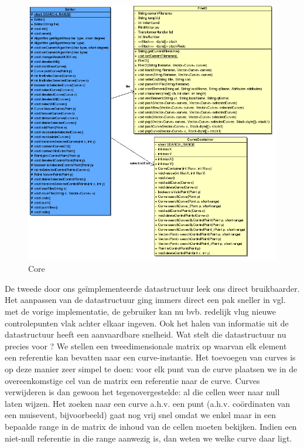 \documentclass[a4paper,11pt,oneside, titlepage]{article}
\begin{document}
\begin{figure}[htbp]
\centering
\includegraphics[scale=0.42]{./UML2/Core.png}
\caption{Core}\label{iCore}
\end{figure}
De tweede door ons ge\"implementeerde datastructuur leek ons direct bruikbaarder. Het aanpassen van de datastructuur ging immers direct een pak sneller in vgl.
met de vorige implementatie, de gebruiker kan nu bvb. redelijk vlug nieuwe controlepunten vlak achter elkaar ingeven. Ook het halen van informatie uit de datastructuur heeft een aanvaardbare snelheid.
Wat stelt die datastructuur nu precies voor ? We stellen een tweedimensionale matrix op waarvan elk element een referentie kan bevatten naar een curve-instantie.
Het toevoegen van curves is op deze manier zeer simpel te doen: voor elk punt van de curve plaatsen we in de overeenkomstige cel van de matrix een referentie naar de curve.
Curves verwijderen is dan gewoon het tegenovergestelde: al die cellen weer naar null laten wijzen. Het zoeken naar een curve a.h.v. een punt (a.h.v. co\"ordinaten van een muisevent, bijvoorbeeld) 
gaat nog vrij snel omdat we enkel maar in een bepaalde range in de matrix de inhoud van de cellen moeten bekijken. Indien een niet-null referentie in die range aanwezig is, dan weten we welke curve
daar ligt.\newline \newline
\end{document}
